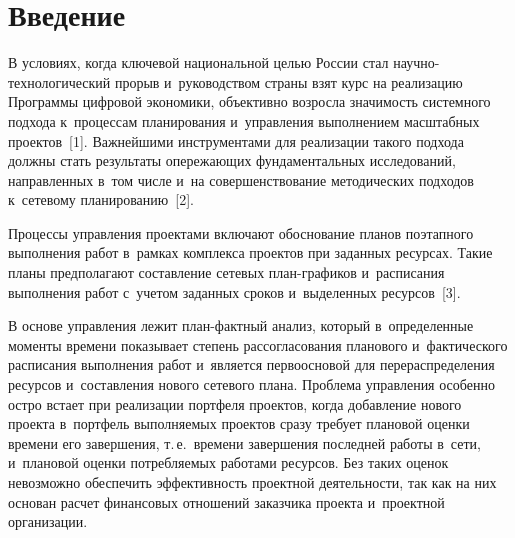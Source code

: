   
\vspace*{1pt}



\thispagestyle{headings}

\begin{multicols}{2}

\label{st\stat}
  
\section{Введение}

\vspace*{-1pt}
  
  В условиях, когда ключевой национальной \mbox{целью} России стал  
на\-уч\-но-тех\-но\-ло\-ги\-че\-ский прорыв и~руководством страны взят курс на 
реализацию Программы цифровой экономики, объективно возросла значимость 
системного подхода к~процес\-сам планирования и~управления выполнением 
масштабных проектов~[1]. Важнейшими инструментами для реализации такого 
подхода должны стать результаты опережающих фундаментальных 
исследований, направленных в~том числе и~на совершенствование 
методических подходов к~сетевому планированию~[2].
  
  Процессы управления проектами включают обоснование планов поэтапного 
выполнения работ в~рамках комплекса проектов при заданных ресурсах. Такие 
планы предполагают составление сетевых план-гра\-фи\-ков и~расписания 
выполнения работ с~учетом заданных сроков и~выделенных ресурсов~[3]. 
  
  В основе управления лежит план-факт\-ный анализ, который в~определенные 
моменты времени показывает степень рассогласования планового 
и~фактического расписания выполнения работ и~является первоосновой для 
перераспределения ресурсов и~составления нового сетевого плана. Проб\-ле\-ма 
управления особенно остро встает при реализации портфеля проектов, когда 
добавление нового проекта в~портфель выполняемых проектов сразу требует 
плановой оценки времени его завершения, т.\,е.\ времени завершения последней 
работы в~сети, и~плановой оценки потребляемых работами ресурсов. Без таких 
оценок невозможно обеспечить эффективность проектной деятельности, так 
как на них основан расчет финансовых отношений заказчика проекта 
и~проектной организации.
  

\end{multicols}
